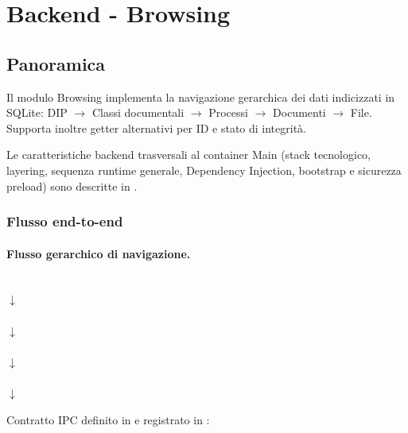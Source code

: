 \newpage
\section{Backend - Browsing}

\subsection{Panoramica}
\label{sec:browsing}

\noindent
Il modulo Browsing implementa la navigazione gerarchica dei dati indicizzati in SQLite: 
DIP $\to$ Classi documentali $\to$ Processi $\to$ Documenti $\to$ File. 
Supporta inoltre getter alternativi per ID e stato di integrità.


\noindent
Le caratteristiche backend trasversali al container Main (stack tecnologico, layering, sequenza runtime generale, Dependency Injection, bootstrap e sicurezza preload) sono descritte in .


\subsubsection{Flusso end-to-end}
\label{sec:browsing:flusso}

\paragraph{Flusso gerarchico di navigazione.}
\begin{center}
   \\
  $\downarrow$ \\
   \\
  $\downarrow$ \\
   \\
  $\downarrow$ \\
   \\
  $\downarrow$ \\
\end{center}

Contratto IPC definito in  e registrato in :

